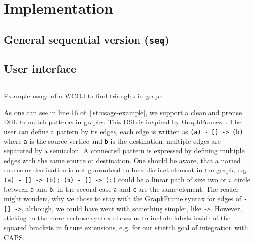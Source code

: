 \section{Implementation}\label{sec:implementation}

\subsection{General sequential version (\texttt{seq})}\label{subsec:general-sequential-versiontexttt}



\subsection{User interface}\label{subsec:user-interface}
\begin{listing}[H]
    \inputminted{scala}{code/usage-example.scala}
    \caption{Example usage of a WCOJ to find triangles in graph.}
    \label{lst:usage-example}
\end{listing}

As one can see in line 16 %
of~\cref{lst:usage-example}, we support a clean and precise DSL to match patterns in graphs.
This DSL is inspired by GraphFrames~\cite{graph-frames}.
The user can define a pattern by its edges, each edge is written as \texttt{(a) - [] -> (b)} where \texttt{a} is the
source vertice and \texttt{b} is the destination, multiple edges are separated by a semicolon.
A connected pattern is expressed by defining multiple edges with the same source or destination.
One should be aware, that a named source or destination is not guaranteed to be a distinct element in the graph,
e.g. \texttt{(a) - [] -> (b); (b) - [] -> (c)} could be a linear path of size two or a circle between \texttt{a} and
\texttt{b}; in the second case \texttt{a} and \texttt{c} are the same element.
The reader might wonders, why we chose to stay with the GraphFrame syntax for edges of
\texttt{- [] ->}, although, we could have went with something simpler, like \texttt{->}.
However, sticking to the more verbose syntax allows us to include labels inside of the squared brackets
in future extensions, e.g. for our stretch goal of integration with CAPS.

